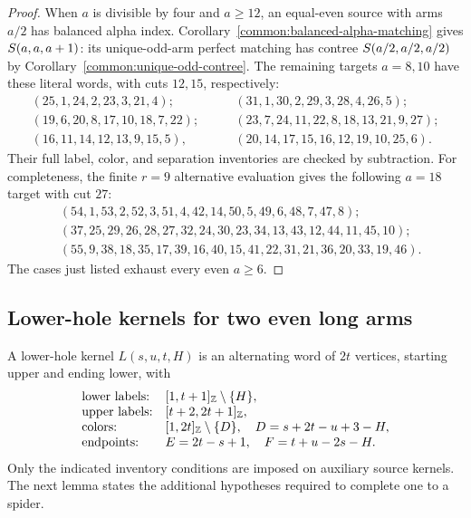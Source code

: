 \begin{proof}
When $a$ is divisible by four and $a\ge12$, an equal-even source
with arms $a/2$ has balanced alpha index.  Corollary~\ref{common:balanced-alpha-matching} gives $S\!\left(a,a,a+1\right)$:
its unique-odd-arm perfect matching has contree $S\!\left(a/2,a/2,a/2\right)$
by Corollary~\ref{common:unique-odd-contree}.  The remaining targets $a=8,10$ have these
literal words, with cuts $12,15$, respectively:
\[
\begin{array}{l}
(25,1,24,2,23,3,21,4);\\
(19,6,20,8,17,10,18,7,22);\\
(16,11,14,12,13,9,15,5),
\end{array}
\qquad
\begin{array}{l}
(31,1,30,2,29,3,28,4,26,5);\\
(23,7,24,11,22,8,18,13,21,9,27);\\
(20,14,17,15,16,12,19,10,25,6).
\end{array}
\]
Their full label, color, and separation inventories are checked by
subtraction.  For completeness, the finite $r=9$ alternative evaluation
gives the following $a=18$ target with cut $27$:
\[
\begin{split}
 &(54,1,53,2,52,3,51,4,42,14,50,5,49,6,48,7,47,8);\\
 &(37,25,29,26,28,27,32,24,30,23,34,13,43,12,44,11,45,10);\\
 &(55,9,38,18,35,17,39,16,40,15,41,22,31,21,36,20,33,19,46).
\end{split}
\]
The cases just listed exhaust every even $a\ge6$.
\end{proof}

\subsection{Lower-hole kernels for two even long arms}
\label{mc:lower-kernels}

\begin{definition}\label{mc:lower-kernel}
A lower-hole kernel $L(s,u,t,H)$ is an alternating word of $2t$
vertices, starting upper and ending lower, with
\[
\begin{array}{ll}
\text{lower labels:}&[1,t+1]_{\mathbb Z}\setminus\{H\},\\
\text{upper labels:}&[t+2,2t+1]_{\mathbb Z},\\
\text{colors:}&[1,2t]_{\mathbb Z}\setminus\{D\},
 \quad D=s+2t-u+3-H,\\
\text{endpoints:}&E=2t-s+1,\quad F=t+u-2s-H.
\end{array}
\]
Only the indicated inventory conditions are imposed on auxiliary
source kernels.  The next lemma states the additional hypotheses
required to complete one to a spider.
\end{definition}

